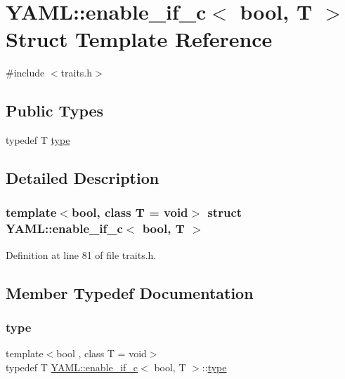 \hypertarget{struct_y_a_m_l_1_1enable__if__c}{}\section{Y\+A\+ML\+::enable\+\_\+if\+\_\+c$<$ bool, T $>$ Struct Template Reference}
\label{struct_y_a_m_l_1_1enable__if__c}


{\ttfamily \#include $<$traits.\+h$>$}

\subsection*{Public Types}
\begin{DoxyCompactItemize}
\item 
typedef T \mbox{\hyperlink{struct_y_a_m_l_1_1enable__if__c_a777d8c40fe7565748a3f966a0dbfe20a}{type}}
\end{DoxyCompactItemize}


\subsection{Detailed Description}
\subsubsection*{template$<$bool, class T = void$>$\newline
struct Y\+A\+M\+L\+::enable\+\_\+if\+\_\+c$<$ bool, T $>$}



Definition at line 81 of file traits.\+h.



\subsection{Member Typedef Documentation}
\mbox{\label{struct_y_a_m_l_1_1enable__if__c_a777d8c40fe7565748a3f966a0dbfe20a}} 
\subsubsection{\texorpdfstring{type}{type}}
{\footnotesize\ttfamily template$<$bool , class T = void$>$ \\
typedef T \mbox{\hyperlink{struct_y_a_m_l_1_1enable__if__c}{Y\+A\+M\+L\+::enable\+\_\+if\+\_\+c}}$<$ bool, T $>$\+::\mbox{\hyperlink{struct_y_a_m_l_1_1enable__if__c_a777d8c40fe7565748a3f966a0dbfe20a}{type}}}




